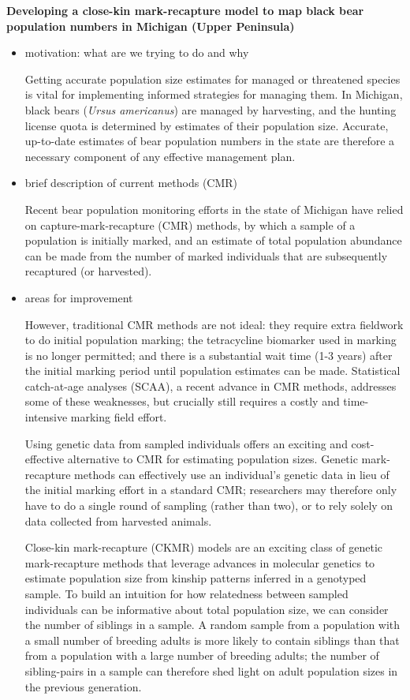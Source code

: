 \documentclass[12pt]{article}
\begin{document}
%
\begin{center}
\textbf{Developing a close-kin mark-recapture model to map black bear population numbers in Michigan (Upper Peninsula)}
\end{center}
%            
\begin{itemize}
\item motivation: what are we trying to do and why

Getting accurate population size estimates 
for managed or threatened species  
is vital for implementing informed strategies for managing them.
In Michigan, black bears (\textit{Ursus americanus}) 
are managed by harvesting, 
and the hunting license quota is determined by 
estimates of their population size.
Accurate, up-to-date estimates of 
bear population numbers in the state 
are therefore a necessary component 
of any effective management plan.

\item brief description of current methods (CMR)

Recent bear population monitoring efforts 
in the state of Michigan have relied on 
capture-mark-recapture (CMR) methods, 
by which a sample of a population is initially marked, 
and an estimate of total population abundance 
can be made from the number of marked individuals 
that are subsequently recaptured (or harvested). 

\item areas for improvement

However, traditional CMR methods are not ideal:  
they require extra fieldwork to do initial population marking; 
the tetracycline biomarker used in marking is no longer permitted; 
and there is a substantial wait time (1-3 years) after the 
initial marking period until population estimates can be made.
Statistical catch-at-age analyses (SCAA), 
a recent advance in CMR methods, 
addresses some of these weaknesses, 
but crucially still requires a costly and time-intensive 
marking field effort.

Using genetic data from sampled individuals 
offers an exciting and cost-effective alternative to CMR 
for estimating population sizes. 
Genetic mark-recapture methods can effectively use 
an individual's genetic data in lieu of 
the initial marking effort in a standard CMR; 
researchers may therefore 
only have to do a single round of sampling 
(rather than two), 
or to rely solely on data collected from harvested animals.

Close-kin mark-recapture (CKMR) models 
are an exciting class of genetic mark-recapture methods 
that leverage advances in molecular genetics 
to estimate population size 
from kinship patterns inferred in a genotyped sample.
To build an intuition for how relatedness 
between sampled individuals can be informative 
about total population size, 
we can consider the number of siblings in a sample.
A random sample from a population 
with a small number of breeding adults 
is more likely to contain siblings than that 
from a population with a large number of breeding adults; 
the number of sibling-pairs in a sample can 
therefore shed light on adult population sizes 
in the previous generation.


\end{itemize}
\end{document}

